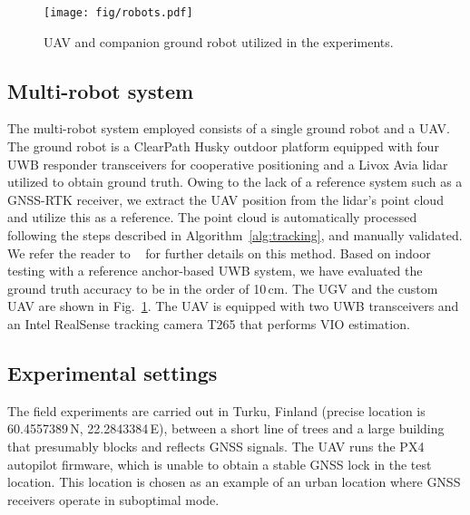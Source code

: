 
\begin{figure}
    \centering
    \texttt{[image: fig/robots.pdf]}
    \caption{UAV and companion ground robot utilized in the experiments.}
    \label{fig:robots}
\end{figure}

\subsection{Multi-robot system}

The multi-robot system employed consists of a single ground robot and a UAV. The ground robot is a ClearPath Husky outdoor platform equipped with four UWB responder transceivers for cooperative positioning and a Livox Avia lidar utilized to obtain ground truth. Owing to the lack of a reference system such as a GNSS-RTK receiver, we extract the UAV position from the lidar's point cloud and utilize this as a reference. The point cloud is automatically processed following the steps described in 
Algorithm~\ref{alg:tracking}, and manually validated. We refer the reader to
~\cite{qingqing2021adaptive}%
for further details on this method. Based on indoor testing with a reference anchor-based UWB system, we have evaluated the ground truth accuracy to be in the order of 10\,cm. The UGV and the custom UAV are shown in Fig.~\ref{fig:robots}. The UAV is equipped with two UWB transceivers and an Intel RealSense tracking camera T265 that performs VIO estimation. 


\subsection{Experimental settings}

The field experiments are carried out in Turku, Finland (precise location is 60.4557389\textdegree\,N, 22.2843384\textdegree\,E), between a short line of trees and a large building that presumably blocks and reflects GNSS signals. The UAV runs the PX4 autopilot firmware, which is unable to obtain a stable GNSS lock in the test location. This location is chosen as an example of an urban location where GNSS receivers operate in suboptimal mode.


